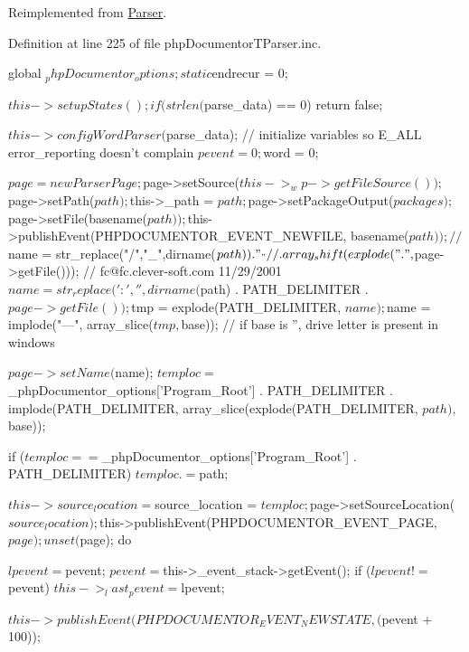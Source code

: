 \-Reimplemented from \hyperlink{class_parser_a20139dbf0050f44b70e34bf32d89d7e4}{\-Parser}.



\-Definition at line 225 of file php\-Documentor\-T\-Parser.\-inc.


\begin{DoxyCode}
    {
        global $_phpDocumentor_options;
        static $endrecur = 0;

        $this->setupStates();
        if (strlen($parse_data) == 0) {
            return false;
        }

        $this->configWordParser($parse_data);
        // initialize variables so E_ALL error_reporting doesn't complain
        $pevent = 0;
        $word   = 0;

        $page = new ParserPage;
        $page->setSource($this->_wp->getFileSource());
        $page->setPath($path);
        $this->_path = $path;
        $page->setPackageOutput($packages);
        $page->setFile(basename($path));
        $this->publishEvent(PHPDOCUMENTOR_EVENT_NEWFILE, basename($path));
        //$name = str_replace("/","_",dirname($path)) . "_" 
        //    . array_shift(explode(".",$page->getFile()));
        // fc@fc.clever-soft.com 11/29/2001
        $name = str_replace(':', '', dirname($path)
            . PATH_DELIMITER . $page->getFile());
        $tmp  = explode(PATH_DELIMITER, $name);
        $name = implode("---", array_slice($tmp, $base));
        // if base is '', drive letter is present in windows

        $page->setName($name);
        $temploc = $_phpDocumentor_options['Program_Root'] 
            . PATH_DELIMITER . implode(PATH_DELIMITER,
            array_slice(explode(PATH_DELIMITER, $path), $base));
        
        if ($temploc == $_phpDocumentor_options['Program_Root'] . 
      PATH_DELIMITER) {
            $temploc .= $path;
        }
        
        $this->source_location = $source_location = $temploc;
        $page->setSourceLocation($source_location);

        $this->publishEvent(PHPDOCUMENTOR_EVENT_PAGE, $page);
        unset($page);
        do {
            $lpevent = $pevent;
            $pevent  = $this->_event_stack->getEvent();
            if ($lpevent != $pevent) {
                $this->_last_pevent = $lpevent;
            }

            $this->publishEvent(PHPDOCUMENTOR_EVENT_NEWSTATE, ($pevent + 100));

}}
\end{DoxyCode}
